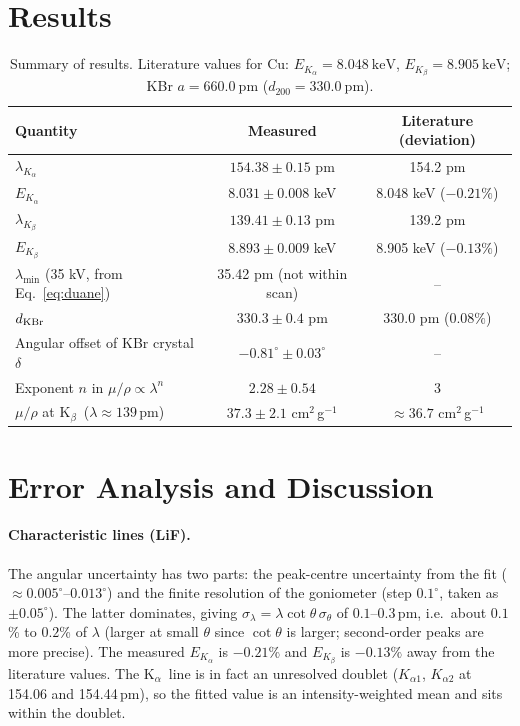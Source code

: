 \documentclass[11pt,a4paper]{article}
\newcommand{\Ka}{K$_\alpha$}
\newcommand{\Kb}{K$_\beta$}
\begin{document}
\section{Results}
\begin{table}[H]
\centering
\caption{Summary of results. Literature values for Cu: $E_{K_\alpha}=\SI{8.048}{\kilo\electronvolt}$, $E_{K_\beta}=\SI{8.905}{\kilo\electronvolt}$; KBr $a=\SI{660.0}{\pico\metre}$ ($d_{200}=\SI{330.0}{\pico\metre}$).}
\label{tab:res}
\begin{tabular}{lcc}
\toprule
Quantity & Measured & Literature (deviation)\\
\midrule
$\lambda_{K_\alpha}$ & $154.38\pm0.15$ pm & 154.2 pm\\
$E_{K_\alpha}$ & $8.031\pm0.008$ keV & 8.048 keV ($-0.21\%$)\\
$\lambda_{K_\beta}$ & $139.41\pm0.13$ pm & 139.2 pm\\
$E_{K_\beta}$ & $8.893\pm0.009$ keV & 8.905 keV ($-0.13\%$)\\
$\lambda_{\min}$ (35 kV, from Eq.~\ref{eq:duane}) & 35.42 pm (not within scan) & --\\
$d_{\rm KBr}$ & $330.3\pm0.4$ pm & 330.0 pm ($0.08\%$)\\
Angular offset of KBr crystal $\delta$ & $-0.81^\circ\pm0.03^\circ$ & --\\
Exponent $n$ in $\mu/\rho\propto\lambda^n$ & $2.28\pm0.54$ & 3\\
$\mu/\rho$ at \Kb\ ($\lambda\approx139$\,pm) & $37.3\pm2.1$ cm$^2$\,g$^{-1}$ & $\approx36.7$ cm$^2$\,g$^{-1}$\\
\bottomrule
\end{tabular}
\end{table}

\section{Error Analysis and Discussion}
\label{sec:err}
\paragraph{Characteristic lines (LiF).} The angular uncertainty has two parts: the peak-centre uncertainty from the fit ($\approx0.005^\circ$--$0.013^\circ$) and the finite resolution of the goniometer (step $0.1^\circ$, taken as $\pm0.05^\circ$). The latter dominates, giving $\sigma_\lambda=\lambda\cot\theta\,\sigma_\theta$ of $0.1$--$0.3$\,pm, i.e.\ about $0.1$\% to $0.2$\% of $\lambda$ (larger at small $\theta$ since $\cot\theta$ is larger; second-order peaks are more precise). The measured $E_{K_\alpha}$ is $-0.21\%$ and $E_{K_\beta}$ is $-0.13\%$ away from the literature values. The \Ka\ line is in fact an unresolved doublet ($K_{\alpha1}$, $K_{\alpha2}$ at 154.06 and 154.44\,pm), so the fitted value is an intensity-weighted mean and sits within the doublet.
\end{document}
